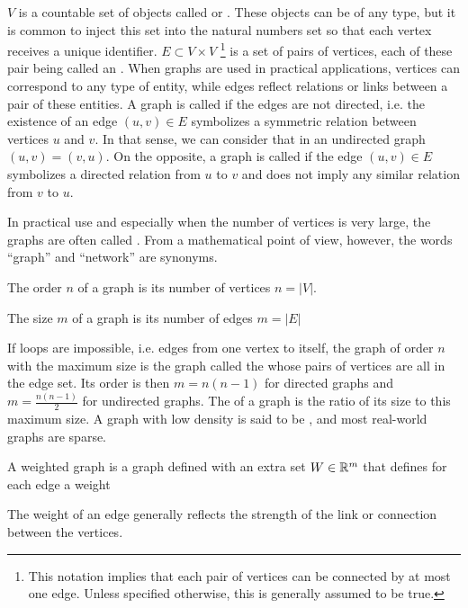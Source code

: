 $V$ is a countable set of objects called  or . These objects can be of any type, but it is common to inject this set into the natural numbers set so that each vertex receives a unique identifier.
$E \subset V\times V$ \footnote{This notation implies that each pair of vertices can be connected by at most one edge. Unless specified otherwise, this is generally assumed to be true.} is a set of pairs of vertices, each of these pair being called an .
When graphs are used in practical applications, vertices can correspond to any type of entity, while edges reflect relations or links between a pair of these entities. A graph is called  if the edges are not directed, i.e. the existence of an edge $(u, v) \in E$ symbolizes a symmetric relation between vertices $u$ and $v$. In that sense, we can consider that in an undirected graph $(u, v) = (v, u)$. On the opposite, a graph is called  if the edge $(u,v) \in E$ symbolizes a directed relation from $u$ to $v$ and does not imply any similar relation from $v$ to $u$.

In practical use and especially when the number of vertices is very large, the graphs are often called . From a mathematical point of view, however, the words “graph” and “network” are synonyms.

\begin{definition}
    The order $n$ of a graph is its number of vertices $n = |V|$.

    The size $m$ of a graph is its number of edges $m = |E|$
\end{definition}

If loops are impossible, i.e. edges from one vertex to itself, the graph of order $n$ with the maximum size is the graph called the  whose pairs of vertices are all in the edge set. Its order is then $m = n(n-1)$ for directed graphs and $m=\frac{n(n-1)}{2}$ for undirected graphs. The  of a graph is the ratio of its size to this maximum size. A graph with low density is said to be , and most real-world graphs are sparse.

\begin{definition}
    A weighted graph is a graph defined with an extra set $W \in \mathbb{R}^m$ that defines for each edge a weight
\end{definition}

The weight of an edge generally reflects the strength of the link or connection between the vertices.


